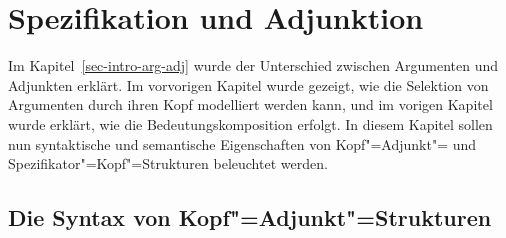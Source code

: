 
\chapter{Spezifikation und Adjunktion}
\label{chap-adjunkte}


Im Kapitel~\ref{sec-intro-arg-adj} wurde der Unterschied zwischen Argumenten und
Adjunkten erklärt. Im vorvorigen Kapitel wurde gezeigt, wie die Selektion von
Argumenten durch ihren Kopf modelliert werden kann, und im vorigen Kapitel wurde
erklärt, wie die Bedeutungskomposition erfolgt. In diesem Kapitel sollen nun
syntaktische und semantische Eigenschaften von Kopf"=Adjunkt"= und
Spezifikator"=Kopf"=Strukturen beleuchtet werden.



\section{Die Syntax von Kopf"=Adjunkt"=Strukturen}
\label{sec-Syntax-Kopf-Adjunkt}

